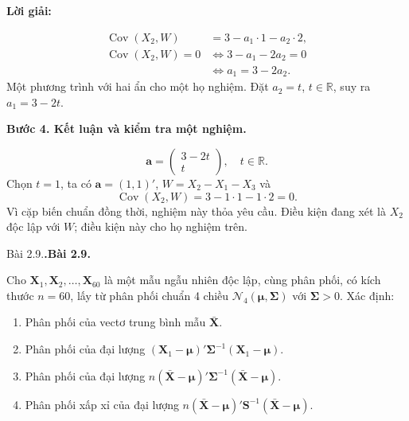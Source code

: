 \documentclass[11pt,a4paper]{article}
\makeatletter
\renewcommand{\boldsymbol}[1]{\symbf{#1}}
\newcounter{prob}
\newenvironment{problem}[1][]{%
  \par\medskip\noindent
  \def\@tempa{#1}%
  \ifx\@tempa\@empty\refstepcounter{prob}\textbf{\theprob.}\else\textbf{#1}\fi
  \ \ignorespaces
}{\par}
\newenvironment{solution}{%
  \par\medskip\noindent\textbf{Lời giải:}\par\nopagebreak[4]\smallskip\noindent\ignorespaces
}{\par}
\newcommand{\answer}[1]{\boxed{#1}}
\newcommand{\step}[2]{\par\medskip\noindent\textbf{Bước #1. #2}\par\nopagebreak[4]\smallskip\noindent}
\makeatother
\begin{document}
\begin{solution}
\begin{enumerate}[label=\textbf{\alph*)}]
\begin{align*}
\operatorname{Cov}(X_2,W)&=3-a_1\cdot1-a_2\cdot2,\\
\operatorname{Cov}(X_2,W)=0
&\iff3-a_1-2a_2=0\\
&\iff a_1=3-2a_2.
\end{align*}
Một phương trình với hai ẩn cho một họ nghiệm. Đặt $a_2=t$, $t\in\mathbb{R}$,
suy ra $a_1=3-2t$.
\step{4}{Kết luận và kiểm tra một nghiệm.}
\[
\answer{\mathbf{a}=\begin{pmatrix}3-2t\\t\end{pmatrix},\quad t\in\mathbb{R}}.
\]
Chọn $t=1$, ta có $\mathbf{a}=(1,1)'$, $W=X_2-X_1-X_3$ và
\[
\operatorname{Cov}(X_2,W)=3-1\cdot1-1\cdot2=0.
\]
Vì cặp biến chuẩn đồng thời, nghiệm này thỏa yêu cầu.
Điều kiện đang xét là $X_2$ độc lập với $W$; điều kiện này cho họ nghiệm trên.
\end{enumerate}
\end{solution}

\begin{problem}[Bài 2.9.]
Cho $\mathbf{X}_1, \mathbf{X}_2, \dots, \mathbf{X}_{60}$ là một mẫu ngẫu nhiên độc lập, cùng phân phối, có kích thước $n = 60$, lấy từ phân phối chuẩn 4 chiều $\mathcal{N}_4(\boldsymbol{\mu}, \boldsymbol{\Sigma})$ với $\boldsymbol{\Sigma} > 0$. Xác định:
\begin{enumerate}[label=\alph*)]
  \item Phân phối của vectơ trung bình mẫu $\bar{\mathbf{X}}$.
  \item Phân phối của đại lượng $(\mathbf{X}_1 - \boldsymbol{\mu})' \boldsymbol{\Sigma}^{-1} (\mathbf{X}_1 - \boldsymbol{\mu})$.
  \item Phân phối của đại lượng $n(\bar{\mathbf{X}} - \boldsymbol{\mu})' \boldsymbol{\Sigma}^{-1} (\bar{\mathbf{X}} - \boldsymbol{\mu})$.
  \item Phân phối xấp xỉ của đại lượng $n(\bar{\mathbf{X}} - \boldsymbol{\mu})' \mathbf{S}^{-1} (\bar{\mathbf{X}} - \boldsymbol{\mu})$.
\end{enumerate}
\end{problem}
\end{document}
